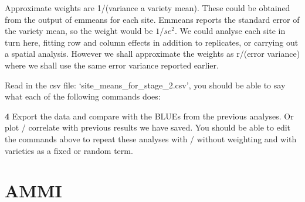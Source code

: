 \documentclass[
]{book}
\makeatletter
\newenvironment{Shaded}{\begin{snugshade}}{\end{snugshade}}
\newcommand{\AttributeTok}[1]{\textcolor[rgb]{0.77,0.63,0.00}{#1}}
\newcommand{\CommentTok}[1]{\textcolor[rgb]{0.56,0.35,0.01}{\textit{#1}}}
\newcommand{\DecValTok}[1]{\textcolor[rgb]{0.00,0.00,0.81}{#1}}
\newcommand{\FloatTok}[1]{\textcolor[rgb]{0.00,0.00,0.81}{#1}}
\newcommand{\FunctionTok}[1]{\textcolor[rgb]{0.00,0.00,0.00}{#1}}
\newcommand{\NormalTok}[1]{#1}
\newcommand{\OtherTok}[1]{\textcolor[rgb]{0.56,0.35,0.01}{#1}}
\newcommand{\SpecialCharTok}[1]{\textcolor[rgb]{0.00,0.00,0.00}{#1}}
\newcommand{\StringTok}[1]{\textcolor[rgb]{0.31,0.60,0.02}{#1}}
\newenvironment{kframe}{%
\medskip{}
\setlength{\fboxsep}{.8em}
 \def\at@end@of@kframe{}%
 \ifinner\ifhmode%
  \def\at@end@of@kframe{\end{minipage}}%
  \begin{minipage}{\columnwidth}%
 \fi\fi%
 \def\FrameCommand##1{\hskip\@totalleftmargin \hskip-\fboxsep
 \colorbox{shadecolor}{##1}\hskip-\fboxsep
     \hskip-\linewidth \hskip-\@totalleftmargin \hskip\columnwidth}%
 \MakeFramed {\advance\hsize-\width
   \@totalleftmargin\z@ \linewidth\hsize
   \@setminipage}}%
 {\par\unskip\endMakeFramed%
 \at@end@of@kframe}
\newenvironment{rmdblock}[1]
  {
  \begin{itemize}
  \renewcommand{\labelitemi}{
    \raisebox{-.7\height}[0pt][0pt]{
      {\setkeys{Gin}{width=3em,keepaspectratio}\texttt{[image: images/\#1]}}
    }
  }
  \setlength{\fboxsep}{1em}
  \begin{kframe}
  \item
  }
  {
  \end{kframe}
  \end{itemize}
  }
\newenvironment{rmdquiz}
  {\begin{rmdblock}{quiz}}
  {\end{rmdblock}}
\makeatother
\begin{document}
Approximate weights are 1/(variance a variety mean). These could be obtained from the output of emmeans for each site. Emmeans reports the standard error of the variety mean, so the weight would be \(1/se^2\). We could analyse each site in turn here, fitting row and column effects in addition to replicates, or carrying out a spatial analysis. However we shall approximate the weights as r/(error variance) where we shall use the same error variance reported earlier.

Read in the csv file: `site\_means\_for\_stage\_2.csv', you should be able to say what each of the following commands does:

\begin{Shaded}
\end{Shaded}

\begin{rmdquiz}
\textbf{4} Export the data and compare with the BLUEs from the previous analyses. Or plot / correlate with previous results we have saved. You should be able to edit the commands above to repeat these analyses with / without weighting and with varieties as a fixed or random term.
\end{rmdquiz}

\hypertarget{ammi}{%
\section{AMMI}\label{ammi}}
\end{document}

